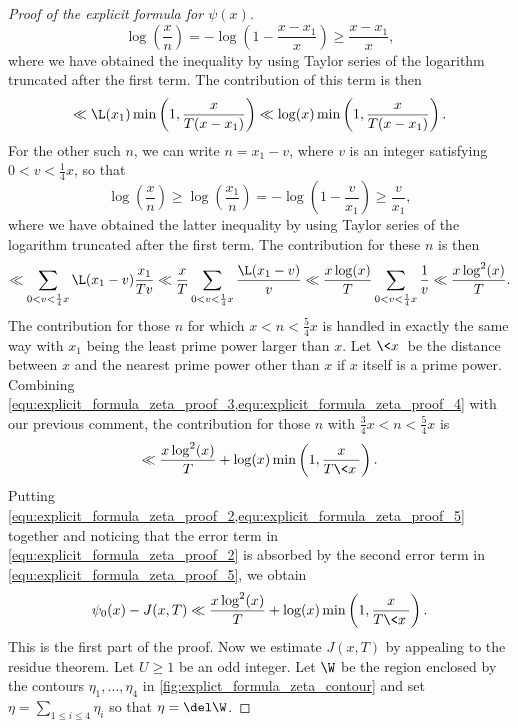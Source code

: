 \begin{proof}[Proof of the explicit formula for $\psi(x)$]
        \[
          \log\left(\frac{x}{n}\right) = -\log\left(1-\frac{x-x_{1}}{x}\right) \ge \frac{x-x_{1}}{x},
        \]
        where we have obtained the inequality by using Taylor series of the logarithm truncated after the first term. The contribution of this term is then
        \begin{equation}\label{equ:explicit_formula_zeta_proof_3}
          \ll \L(x_{1})\min\left(1,\frac{x}{T(x-x_{1})}\right) \ll \log(x)\min\left(1,\frac{x}{T(x-x_{1})}\right).
        \end{equation}
        For the other such $n$, we can write $n = x_{1}-v$, where $v$ is an integer satisfying $0 < v < \frac{1}{4}x$, so that
        \[
          \log\left(\frac{x}{n}\right) \ge \log\left(\frac{x_{1}}{n}\right) = -\log\left(1-\frac{v}{x_{1}}\right) \ge \frac{v}{x_{1}},
        \]
        where we have obtained the latter inequality by using Taylor series of the logarithm truncated after the first term. The contribution for these $n$ is then
        \begin{equation}\label{equ:explicit_formula_zeta_proof_4}
          \ll \sum_{0 < v < \frac{1}{4}x}\L(x_{1}-v)\frac{x_{1}}{Tv} \ll \frac{x}{T}\sum_{0 < v < \frac{1}{4}x}\frac{\L(x_{1}-v)}{v} \ll \frac{x\log(x)}{T}\sum_{0 < v < \frac{1}{4}x}\frac{1}{v} \ll \frac{x\log^{2}(x)}{T}.
        \end{equation}
        The contribution for those $n$ for which $x < n < \frac{5}{4}x$ is handled in exactly the same way with $x_{1}$ being the least prime power larger than $x$. Let $\<x\>$ be the distance between $x$ and the nearest prime power other than $x$ if $x$ itself is a prime power. Combining \cref{equ:explicit_formula_zeta_proof_3,equ:explicit_formula_zeta_proof_4} with our previous comment, the contribution for those $n$ with $\frac{3}{4}x < n < \frac{5}{4}x$ is
        \begin{equation}\label{equ:explicit_formula_zeta_proof_5}
          \ll \frac{x\log^{2}(x)}{T}+\log(x)\min\left(1,\frac{x}{T\<x\>}\right).
        \end{equation}
        Putting \cref{equ:explicit_formula_zeta_proof_2,equ:explicit_formula_zeta_proof_5} together and noticing that the error term in \cref{equ:explicit_formula_zeta_proof_2} is absorbed by the second error term in \cref{equ:explicit_formula_zeta_proof_5}, we obtain
        \begin{equation}\label{equ:explicit_formula_zeta_proof_6}
          \psi_{0}(x)-J(x,T) \ll \frac{x\log^{2}(x)}{T}+\log(x)\min\left(1,\frac{x}{T\<x\>}\right).
        \end{equation}
        This is the first part of the proof. Now we estimate $J(x,T)$ by appealing to the residue theorem. Let $U \ge 1$ be an odd integer. Let $\W$ be the region enclosed by the contours $\eta_{1},\ldots,\eta_{4}$ in \cref{fig:explict_formula_zeta_contour} and set $\eta = \sum_{1 \le i \le 4}\eta_{i}$ so that $\eta = \del \W$.


\end{proof}

